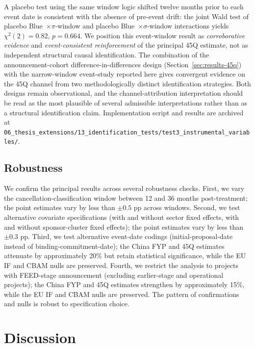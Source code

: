 \documentclass[12pt,a4paper]{article}
\theoremstyle{plain}
\theoremstyle{definition}
\begin{document}
A placebo test using the same window logic shifted twelve months prior to each event date is consistent with the absence of pre-event drift: the joint Wald test of placebo Blue~$\times \pi$-window and placebo Blue~$\times \sigma$-window interactions yields $\chi^2(2) = 0.82$, $p = 0.664$. We position this event-window result as \emph{corroborative evidence} and \emph{event-consistent reinforcement} of the principal 45Q estimate, not as independent structural causal identification. The combination of the announcement-cohort difference-in-differences design (Section~\ref{sec:results-45q}) with the narrow-window event-study reported here gives convergent evidence on the 45Q channel from two methodologically distinct identification strategies. Both designs remain observational, and the channel-attribution interpretation should be read as the most plausible of several admissible interpretations rather than as a structural identification claim. Implementation script and results are archived at \texttt{06\_thesis\_extensions/13\_identification\_tests/test3\_instrumental\_variables/}.

\subsection{Robustness}
\label{sec:results-robustness}

We confirm the principal results across several robustness checks. First, we vary the cancellation-classification window between 12 and 36 months post-treatment; the point estimates vary by less than $\pm 0.5$ pp across windows. Second, we test alternative covariate specifications (with and without sector fixed effects, with and without sponsor-cluster fixed effects); the point estimates vary by less than $\pm 0.3$ pp. Third, we test alternative event-date codings (initial-proposal-date instead of binding-commitment-date); the China FYP and 45Q estimates attenuate by approximately 20\% but retain statistical significance, while the EU IF and CBAM nulls are preserved. Fourth, we restrict the analysis to projects with FEED-stage announcement (excluding earlier-stage and operational projects); the China FYP and 45Q estimates strengthen by approximately 15\%, while the EU IF and CBAM nulls are preserved. The pattern of confirmations and nulls is robust to specification choice.

\section{Discussion}
\label{sec:discussion}
\end{document}
